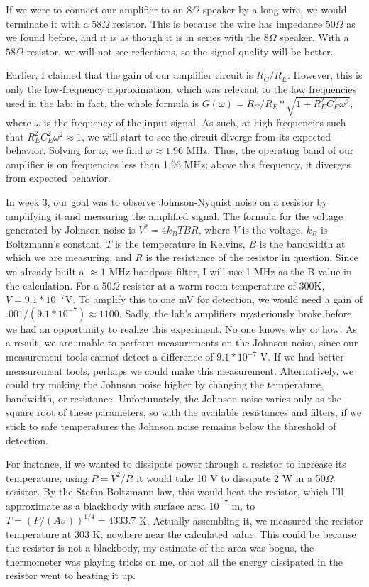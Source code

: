 \documentclass[11pt]{article}
\newcommand{\Ohm}{\Omega}
\begin{document}
If we were to connect our amplifier to an $8\Omega$ speaker by a long wire, we would terminate it with a 58$\Omega$ resistor.
This is because the wire has impedance $50 \Omega$ as we found before, and it is as though it is in series with the $8\Ohm$
speaker. With a $58\Omega$ resistor, we will not see reflections, so the signal quality will be better.

Earlier, I claimed that the gain of our amplifier circuit is $R_C / R_E$. However, this is only the low-frequency approximation,
which was relevant to the low frequencies used in the lab: in fact, the whole formula is
$G(\omega) = R_C / R_E * \sqrt{1 + R_E^2C_E^2\omega^2}$, where $\omega$ is the frequency of
the input signal. As such, at high frequencies such that $R_E^2C_E^2\omega^2 \approx 1$, we will
start to see the circuit diverge from its expected behavior. Solving for $\omega$, we find $\omega \approx 1.96$ MHz. Thus, the
operating band of our amplifier is on frequencies less than 1.96 MHz; above this frequency, it diverges from expected behavior.

In week 3, our goal was to observe Johnson-Nyquist noise on a resistor by amplifying it and measuring 
the amplified signal. The formula for the voltage generated by Johnson noise is
$V^2 = 4k_BTBR$, where $V$ is the voltage, $k_B$ is Boltzmann's constant, $T$ is the temperature
in Kelvins, $B$ is the bandwidth at which we are measuring, and $R$ is the resistance of the resistor
in question. Since we already built a $\approx 1$ MHz bandpass filter, I will use 1 MHz as the B-value in the calculation. 
For a 50$\Omega$ resistor at a warm room temperature of 300K,  $V = 9.1 * 10^{-7}$V. To amplify this to one mV for
detection, we would need a gain of $.001/(9.1 * 10^{-7}) \approx 1100$. Sadly, the lab's amplifiers mysteriously broke
before we had an opportunity to realize this experiment. No one knows why or how. As a result, we are unable to perform
measurements on the Johnson noise, since our measurement tools cannot detect a difference of $9.1*10^{-7}$ V. If we had
better measurement tools, perhaps we could make this measurement. Alternatively, we could try making the Johnson noise higher
by changing the temperature, bandwidth, or resistance. Unfortunately, the Johnson noise varies only as the square root
of these parameters, so with the available resistances and filters, if we stick to safe temperatures the Johnson noise
remains below the threshold of detection.

For instance, if we wanted to dissipate power through a resistor to increase its temperature, using $P = V^2 / R$ it would take
10 V to dissipate 2 W in a 50$\Omega$ resistor. By the Stefan-Boltzmann law, this would heat the resistor, which I'll approximate
as a blackbody with surface area $10^{-7}$ m, to $T = (P/(A\sigma))^{1/4} = 4333.7$ K. Actually assembling it, we measured the 
resistor temperature at 303 K, nowhere near the calculated value. This could be because the resistor is not a blackbody, 
my estimate of the area was bogus, the thermometer was playing tricks on me, or not all the energy dissipated in the resistor
went to heating it up. 
\end{document}
